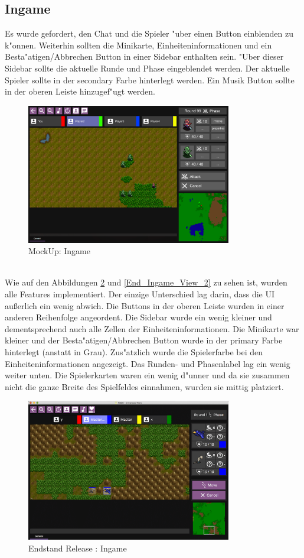 \documentclass[12pt, titlepage]{scrartcl}
\newcommand{\RN}[1]{%
	\textup{\uppercase\expandafter{\romannumeral#1}}%
}
\begin{document}
		\subsection{Ingame}
			Es wurde gefordert, den Chat und die Spieler "uber einen Button einblenden zu k"onnen. Weiterhin sollten die Minikarte, Einheiteninformationen und ein Besta"atigen/Abbrechen Button in einer Sidebar enthalten sein. "Uber dieser Sidebar sollte die aktuelle Runde und Phase eingeblendet werden. Der aktuelle Spieler sollte in der secondary Farbe hinterlegt werden. Ein Musik Button sollte in der oberen Leiste hinzugef"ugt werden.
			\begin{figure}[H] 
				\centering
				\includegraphics[width=0.8\textwidth]{images/mockUps/Ingame.png}
				\caption{MockUp: Ingame}
				\label{Ingame_View_2}
			\end{figure}
			\ \\ Wie auf den Abbildungen \ref{End_Ingame_View} und \ref{End_Ingame_View_2} zu sehen ist, wurden alle Features implementiert. Der einzige Unterschied lag darin, dass die UI au{\ss}erlich ein wenig abwich. Die Buttons in der oberen Leiste wurden in einer anderen Reihenfolge angeordent. Die Sidebar wurde ein wenig kleiner und dementsprechend auch alle Zellen der Einheiteninformationen. Die Minikarte war kleiner und der Besta"atigen/Abbrechen Button wurde in der primary Farbe hinterlegt (anstatt in Grau). Zus"atzlich wurde die Spielerfarbe bei den Einheiteninformationen angezeigt. Das Runden- und Phasenlabel lag ein wenig weiter unten. Die Spielerkarten waren ein wenig d"unner und da sie zusammen nicht die ganze Breite des Spielfeldes einnahmen, wurden sie mittig platziert.
			\begin{figure}[H] 
				\centering
				\includegraphics[width=0.8\textwidth]{images/endOfRelease/Ingame.png}
				\caption{Endstand Release \RN{3}: Ingame}
				\label{End_Ingame_View}
			\end{figure}
\end{document}

